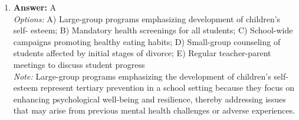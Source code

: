 \documentclass[12pt]{article}
\begin{document}
\begin{enumerate}[label=\arabic*.]
\\ \textit{Note:} The correct answer is rationality versus irrationality because the debate over whether development occurs in stages often involves examining the cognitive processes that underpin rational decision-making during different developmental phases, highlighting how reasoning can evolve or manifest differently across stages.
\item \textbf{Answer:} A
\\ \textit{Options:} A) Large-group programs emphasizing development of children's self- esteem; B) Mandatory health screenings for all students; C) School-wide campaigns promoting healthy eating habits; D) Small-group counseling of students affected by initial stages of divorce; E) Regular teacher-parent meetings to discuss student progress
\\ \textit{Note:} Large-group programs emphasizing the development of children's self-esteem represent tertiary prevention in a school setting because they focus on enhancing psychological well-being and resilience, thereby addressing issues that may arise from previous mental health challenges or adverse experiences.
\end{enumerate}
\end{document}

